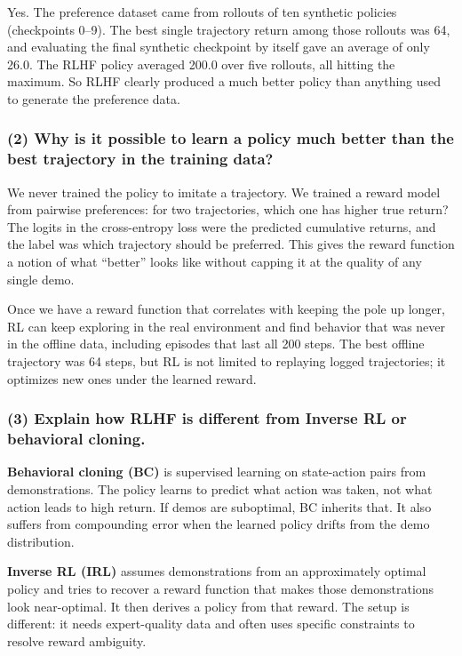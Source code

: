 \documentclass[11pt]{article}
\begin{document}
Yes. The preference dataset came from rollouts of ten synthetic policies (checkpoints 0--9). The best single trajectory return among those rollouts was 64, and evaluating the final synthetic checkpoint by itself gave an average of only 26.0. The RLHF policy averaged 200.0 over five rollouts, all hitting the maximum. So RLHF clearly produced a much better policy than anything used to generate the preference data.

\subsubsection*{(2) Why is it possible to learn a policy much better than the best trajectory in the training data?}

We never trained the policy to imitate a trajectory. We trained a reward model from pairwise preferences: for two trajectories, which one has higher true return? The logits in the cross-entropy loss were the predicted cumulative returns, and the label was which trajectory should be preferred. This gives the reward function a notion of what ``better'' looks like without capping it at the quality of any single demo.

Once we have a reward function that correlates with keeping the pole up longer, RL can keep exploring in the real environment and find behavior that was never in the offline data, including episodes that last all 200 steps. The best offline trajectory was 64 steps, but RL is not limited to replaying logged trajectories; it optimizes new ones under the learned reward.

\subsubsection*{(3) Explain how RLHF is different from Inverse RL or behavioral cloning.}

\textbf{Behavioral cloning (BC)} is supervised learning on state-action pairs from demonstrations. The policy learns to predict what action was taken, not what action leads to high return. If demos are suboptimal, BC inherits that. It also suffers from compounding error when the learned policy drifts from the demo distribution.

\textbf{Inverse RL (IRL)} assumes demonstrations from an approximately optimal policy and tries to recover a reward function that makes those demonstrations look near-optimal. It then derives a policy from that reward. The setup is different: it needs expert-quality data and often uses specific constraints to resolve reward ambiguity.
\end{document}
